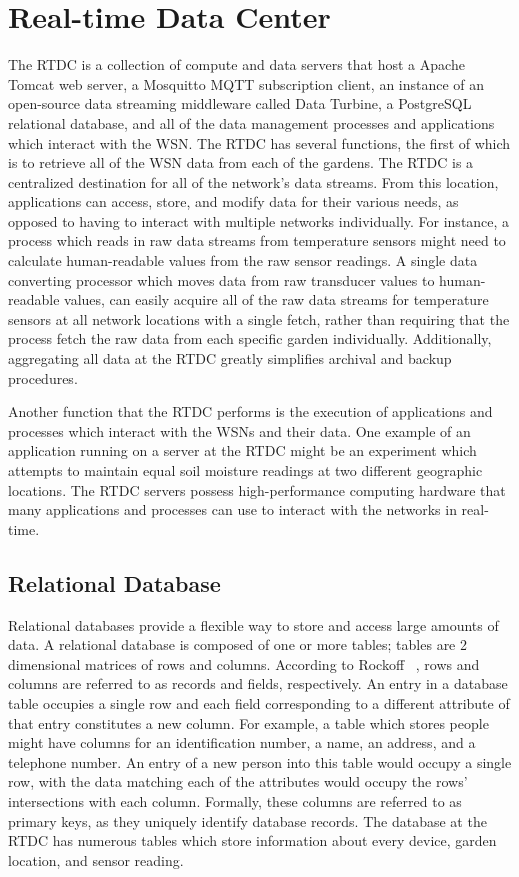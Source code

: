 \section{Real-time Data Center}
The RTDC is a collection of compute and data servers that host a Apache Tomcat web server, a Mosquitto MQTT subscription client, an instance of an open-source data streaming middleware called Data Turbine, a PostgreSQL relational database, and all of the data management processes and applications which interact with the WSN. The RTDC has several functions, the first of which is to retrieve all of the WSN data from each of the gardens. The RTDC is a centralized destination for all of the network's data streams. From this location, applications can access, store, and modify data for their various needs, as opposed to having to interact with multiple networks individually. For instance, a process which reads in raw data streams from temperature sensors might need to calculate human-readable values from the raw sensor readings. A single data converting processor which moves data from raw transducer values to human-readable values, can easily acquire all of the raw data streams for temperature sensors at all network locations with a single fetch, rather than requiring that the process fetch the raw data from each specific garden individually. Additionally, aggregating all data at the RTDC greatly simplifies archival and backup procedures.

Another function that the RTDC performs is the execution of applications and processes which interact with the WSNs and their data. One example of an application running on a server at the RTDC might be an experiment which attempts to maintain equal soil moisture readings at two different geographic locations. The RTDC servers possess high-performance computing hardware that many applications and processes can use to interact  with the networks in real-time.

\subsection{Relational Database}
Relational databases provide a flexible way to store and access large amounts of data. A relational database is composed of one or more tables; tables are 2 dimensional matrices of rows and columns. According to Rockoff ~\cite{rockoff2010language}, rows and columns are referred to as records and fields, respectively. An entry in a database table occupies a single row and each field corresponding to a different attribute of that entry constitutes a new column. For example, a table which stores people might have columns for an identification number, a name, an address, and a telephone number. An entry of a new person into this table would occupy a single row, with the data matching each of the attributes would occupy the rows' intersections with each column. Formally, these columns are referred to as primary keys, as they uniquely identify database records. The database at the RTDC has numerous tables which store information about every device, garden location, and sensor reading.

